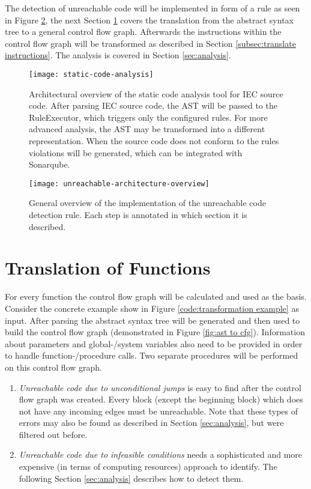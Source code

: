The detection of unreachable code will be implemented in form of a rule as seen in Figure \ref{fig:unreachable-architecture-overview}, the next Section \ref{sec:translation} covers the translation from the abstract syntax tree to a general control flow graph. 
Afterwards the instructions within the control flow graph will be transformed as described in Section \ref{subsec:translate instructions}.
The analysis is covered in Section \ref{sec:analysis}.

\begin{figure}
	\centering
	\texttt{[image: static-code-analysis]}
	\caption{Architectural overview of the static code analysis tool for IEC source code. After parsing IEC source code, the AST will be passed to the RuleExecutor, which triggers only the configured rules. For more advanced analysis, the AST may be transformed into a different representation. When the source code does not conform to the rules violations will be generated, which can be integrated with Sonarqube.}
	\label{fig:general architecture}
\end{figure}

\begin{figure}
	\centering
	\texttt{[image: unreachable-architecture-overview]}
	\caption{General overview of the implementation of the unreachable code detection rule. Each step is annotated in which section it is described. }
	\label{fig:unreachable-architecture-overview}
\end{figure}

\section{Translation of Functions}
\label{sec:translation}
For every function the control flow graph will be calculated and used as the basis. 
Consider the concrete example show in Figure \ref{code:transformation example} as input. 
After parsing the abstract syntax tree will be generated and then used to build the control flow graph (demonstrated in Figure \ref{fig:ast to cfg}).
Information about parameters and global-/system variables also need to be provided in order to handle function-/procedure calls. 
Two separate procedures will be performed on this control flow graph.
\begin{enumerate}
	\item \emph{Unreachable code due to unconditional jumps} is easy to find after the control flow graph was created. Every block (except the beginning block) which does not have any incoming edges must be unreachable.
	Note that these types of errors may also be found as described in Section \ref{sec:analysis}, but were filtered out before.
	\item \emph{Unreachable code due to infeasible conditions} needs a sophisticated and more expensive (in terms of computing resources) approach to identify. The following Section \ref{sec:analysis} describes how to detect them.
\end{enumerate}

